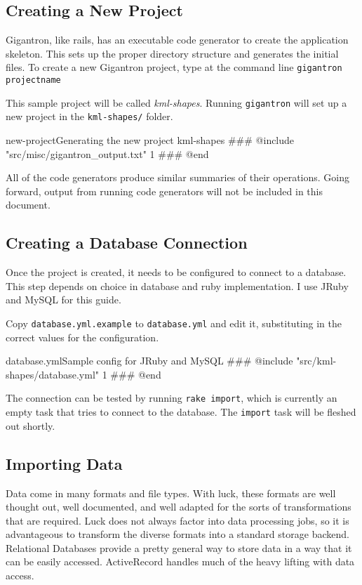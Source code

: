\documentclass[12pt]{article}
\begin{document}
\subsection*{Creating a New Project}

Gigantron, like rails, has an executable code generator to create the application skeleton.  This sets up the proper directory structure and generates the initial files. To create a new Gigantron project, type at the command line \texttt{gigantron projectname}

This sample project will be called \textit{kml-shapes}.  Running \texttt{gigantron} will set up a new project in the \texttt{kml-shapes/} folder.

\begin{code}{new-project}{Generating the new project kml-shapes}
### @include "src/misc/gigantron_output.txt" 1
### @end
\end{code}

All of the code generators produce similar summaries of their operations.  Going forward, output from running code generators will not be included in this document.

\subsection*{Creating a Database Connection}

Once the project is created, it needs to be configured to connect to a database.  This step depends on choice in database and ruby implementation.  I use JRuby and MySQL for this guide.

Copy \texttt{database.yml.example} to \texttt{database.yml} and edit it, substituting in the correct values for the configuration.

\begin{code}{database.yml}{Sample config for JRuby and MySQL}
### @include "src/kml-shapes/database.yml" 1
### @end
\end{code}

The connection can be tested by running \texttt{rake import}, which is currently an empty task that tries to connect to the database.  The \texttt{import} task will be fleshed out shortly.

\subsection*{Importing Data}

Data come in many formats and file types. With luck, these formats are well thought out, well documented, and well adapted for the sorts of transformations that are required.  Luck does not always factor into data processing jobs, so it is advantageous to transform the diverse formats into a standard storage backend.  Relational Databases provide a pretty general way to store data in a way that it can be easily accessed.  ActiveRecord handles much of the heavy lifting with data access.
\end{document}

